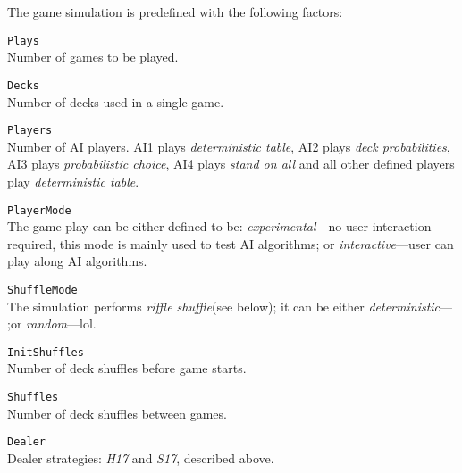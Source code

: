 \documentclass[12pt,a4paper,twocolumn]{article}
\begin{document}
The game simulation is predefined with the following factors:
\begin{description}
\item{\texttt{Plays}} \hfill\\
Number of games to be played.
\item{\texttt{Decks}} \hfill\\
Number of decks used in a single game.
\item{\texttt{Players}} \hfill\\
Number of AI players. AI1 plays \emph{deterministic table}, AI2 plays \emph{deck probabilities}, AI3 plays \emph{probabilistic choice}, AI4 plays \emph{stand on all} and all other defined players play \emph{deterministic table}.
\item{\texttt{PlayerMode}} \hfill\\
The game-play can be either defined to be: \emph{experimental}---no user interaction required, this mode is mainly used to test AI algorithms; or \emph{interactive}---user can play along AI algorithms.
\item{\texttt{ShuffleMode}} \hfill\\
The simulation performs \emph{riffle shuffle}(see below); it can be either \emph{deterministic}--- ;or \emph{random}---lol.
\item{\texttt{InitShuffles}} \hfill\\
Number of deck shuffles before game starts.
\item{\texttt{Shuffles}} \hfill\\
Number of deck shuffles between games.
\item{\texttt{Dealer}} \hfill\\
Dealer strategies: \emph{H17} and \emph{S17}, described above.
\end{description}
\end{document}
